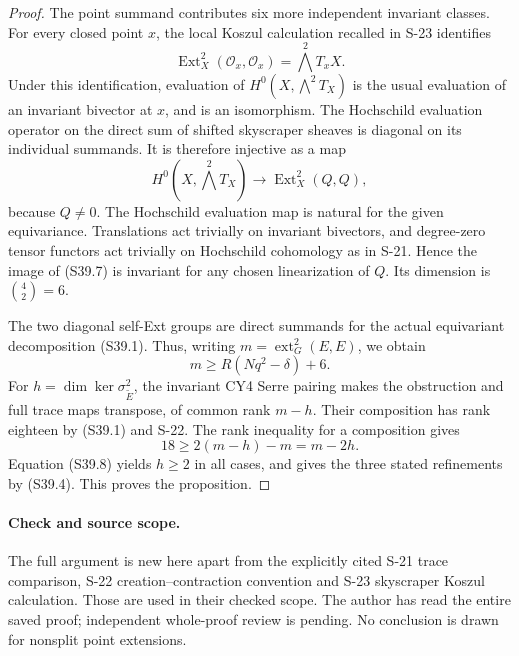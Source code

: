 \begin{proof}
The point summand contributes six more independent invariant classes.
For every closed point $x$, the local Koszul calculation recalled in S-23
identifies
\[
 \operatorname{Ext}^2_X(\mathcal O_x,\mathcal O_x)
      =\bigwedge^2T_xX.
\]
Under this identification, evaluation of
$H^0(X,\bigwedge^2T_X)$ is the usual evaluation of an invariant bivector
at $x$, and is an isomorphism. The Hochschild evaluation operator on the direct sum of shifted
skyscraper sheaves is diagonal on its individual summands. It is therefore
injective as a map
\[
 H^0(X,\bigwedge^2T_X)\longrightarrow
            \operatorname{Ext}^2_X(Q,Q),
 \tag{S39.7}
\]
because $Q\ne0$. The Hochschild evaluation map is natural for the given
equivariance. Translations act trivially on invariant bivectors, and
degree-zero tensor functors act trivially on Hochschild cohomology as in
S-21. Hence the image of (S39.7) is invariant for any chosen linearization
of $Q$. Its dimension is $\binom42=6$.

The two diagonal self-Ext groups are direct summands for the actual
equivariant decomposition (S39.1). Thus, writing
$m=\operatorname{ext}^2_G(E,E)$, we obtain
\[
 m\ge R(Nq^2-\delta)+6.
 \tag{S39.8}
\]
For $h=\dim\ker\sigma^2_{\widetilde E}$, the invariant CY4 Serre
pairing makes the obstruction and full trace maps transpose, of common
rank $m-h$. Their composition has rank eighteen by (S39.1) and S-22.
The rank inequality for a composition gives
\[
 18\ge2(m-h)-m=m-2h.
\]
Equation (S39.8) yields $h\ge2$ in all cases, and gives the three stated
refinements by (S39.4). This proves the proposition.
\end{proof}

\paragraph{Check and source scope.}
The full argument is new here apart from the explicitly cited S-21
trace comparison, S-22 creation--contraction convention and S-23
skyscraper Koszul calculation. Those are used in their checked scope.
The author has read the entire saved proof; independent whole-proof
review is pending. No conclusion is drawn for nonsplit point extensions.
